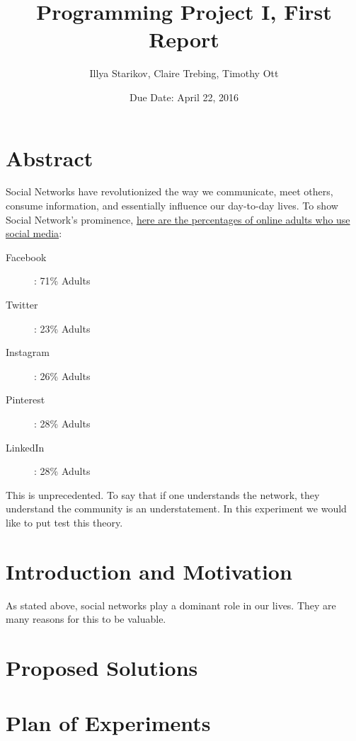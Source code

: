 \documentclass{article}
\title{Programming Project I, First Report}
\author{Illya Starikov, Claire Trebing, Timothy Ott}
\date{Due Date: April 22, 2016}
\begin{document}
\maketitle

\section{Abstract}
Social Networks have revolutionized the way we communicate, meet others, consume information, and essentially influence our day-to-day lives. To show Social Network's prominence, \href{http://www.pewinternet.org/fact-sheets/social-networking-fact-sheet/}{here are the percentages of online adults who use social media}:

\begin{description}
    \item [Facebook]: 71\% Adults
    \item [Twitter]: 23\% Adults
    \item [Instagram]: 26\% Adults
    \item [Pinterest]: 28\% Adults
    \item [LinkedIn]: 28\% Adults
\end{description}

This is unprecedented. To say that if one understands the network, they understand the community is an understatement. In this experiment we would like to put test this theory.

\section{Introduction and Motivation}
As stated above, social networks play a dominant role in our lives. They are many reasons for this to be valuable.

\section{Proposed Solutions}

\section{Plan of Experiments}
\end{document}
